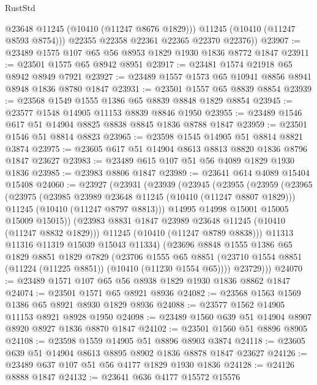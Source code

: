 \begin{lexlean}{RustStd}
\begin{coremodule}
            @23648
            @11245
            (@10410 (@11247 @8676 @1829)))
          @11245
          (@10410 (@11247 @8593 @8754)))
        @22355
        @22358
        @22361
        @22365
        @22370
        @22376))
@23907 := @23489 @1575 @107 @65 @56 @8953 @1829 @1930 @1836 @8772 @1847
@23911 := @23501 @1575 @65 @8942 @8951
@23917 := @23481 @1574 @21918 @65 @8942 @8949 @7921
@23927 := @23489 @1557 @1573 @65 @10941 @8856 @8941 @8948 @1836 @8780 @1847
@23931 := @23501 @1557 @65 @8839 @8854
@23939 := @23568 @1549 @1555 @1386 @65 @8839 @8848 @1829 @8854
@23945 := @23577 @1548 @14905 @11153 @8839 @8846 @1950
@23955 := @23489 @1546 @617 @51 @14904 @8825 @8838 @8845 @1836 @8788 @1847
@23959 := @23501 @1546 @51 @8814 @8823
@23965 := @23598 @1545 @14905 @51 @8814 @8821 @3874
@23975 := @23605 @617 @51 @14904 @8613 @8813 @8820 @1836 @8796 @1847 @23627
@23983 := @23489 @615 @107 @51 @56 @4089 @1829 @1930 @1836
@23985 := @23983 @8806 @1847
@23989 := @23641 @614 @4089 @15404 @15408
@24060 := @23927
    (@23931
      (@23939
        (@23945
          (@23955
            (@23959
              (@23965
                (@23975
                  (@23985 @23989 @23648 @11245 (@10410 (@11247 @8807 @1829)))
                  @11245
                  (@10410 (@11247 @8797 @8813)))
                @14995
                @14998
                @15001
                @15005
                @15009
                @15015))
            (@23983 @8831 @1847 @23989 @23648 @11245 (@10410 (@11247 @8832 @1829)))
            @11245
            (@10410 (@11247 @8789 @8838)))
          @11313
          @11316
          @11319
          @15039
          @15043
          @11334)
        (@23696
          @8848
          @1555
          @1386
          @65
          @1829
          @8851
          @1829
          @7829
          (@23706
            @1555
            @65
            @8851
            (@23710 @1554 @8851 (@11224 (@11225 @8851)) (@10410 (@11230 @1554 @65))))
          @23729)))
@24070 := @23489 @1571 @107 @65 @56 @8938 @1829 @1930 @1836 @8862 @1847
@24074 := @23501 @1571 @65 @8921 @8936
@24082 := @23568 @1563 @1569 @1386 @65 @8921 @8930 @1829 @8936
@24088 := @23577 @1562 @14905 @11153 @8921 @8928 @1950
@24098 := @23489 @1560 @639 @51 @14904 @8907 @8920 @8927 @1836 @8870 @1847
@24102 := @23501 @1560 @51 @8896 @8905
@24108 := @23598 @1559 @14905 @51 @8896 @8903 @3874
@24118 := @23605 @639 @51 @14904 @8613 @8895 @8902 @1836 @8878 @1847 @23627
@24126 := @23489 @637 @107 @51 @56 @4177 @1829 @1930 @1836
@24128 := @24126 @8888 @1847
@24132 := @23641 @636 @4177 @15572 @15576

\end{coremodule}
\end{lexlean}
